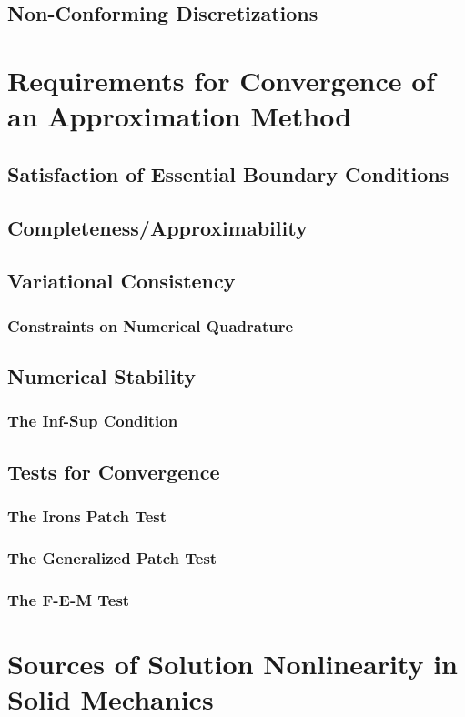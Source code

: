 \subsection{Non-Conforming Discretizations}

\section{Requirements for Convergence of an Approximation Method}
\subsection{Satisfaction of Essential Boundary Conditions}
\subsection{Completeness/Approximability}
\subsection{Variational Consistency}
\subsubsection{Constraints on Numerical Quadrature}
\subsection{Numerical Stability}
\subsubsection{The Inf-Sup Condition}
\subsection{Tests for Convergence}
\subsubsection{The Irons Patch Test}
\subsubsection{The Generalized Patch Test}
\subsubsection{The F-E-M Test}

\section{Sources of Solution Nonlinearity in Solid Mechanics}

